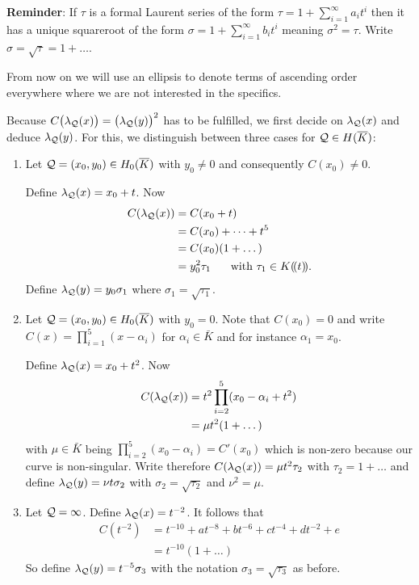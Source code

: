 \documentclass[english,11pt,a4paper]{article}
\begin{document}
\textbf{Reminder}: If $\tau$ is a formal Laurent series of the form $\tau = 1 + \sum_{i = 1}^{\infty} a_i t^i$ then it has a unique squareroot of the form $\sigma = 1+\sum_{i = 1}^{\infty} b_i t^i$ meaning $\sigma^2 = \tau$. Write $\sigma = \sqrt \tau = 1 + \dots$.

From now on we will use an ellipsis to denote terms of ascending order everywhere where we are not interested in the specifics.

\begin{defin}
	Because $C\big(\lambda_{\mathcal{Q}}(x)\big)=\big(\lambda_{\mathcal{Q}}(y)\big)^2$ has to be fulfilled, we first decide on $\lambda_{\mathcal{Q}}(x)$ and deduce $\lambda_{\mathcal{Q}}(y)$. For this, we distinguish between three cases for $\mathcal{Q} \in H(\overline K)$:
	\begin{enumerate}[1.]
		\item Let $\mathcal{Q} =(x_0,y_0) \in H_0(\overline K)$ with $y_0 \neq 0$ and consequently $C(x_0)\neq 0$.

		Define $\lambda_{\mathcal{Q}}(x) = x_0 + t$. Now
		\begin{align*}
		  C(\lpx) &= C(x_0+t)\\
		          &= C(x_0)+ \dots + t^5\\
		          &= C(x_0)(1 + \dots)\\ %
		          &= y_0^2 \tau_1 \text{\hspace{5mm} with } \tau_1 \in K (\! (t)\! ).
		\end{align*}
		Define $\lambda_{\mathcal{Q}}(y) = y_0 \sigma_1$ where $\sigma_1 = \sqrt{\tau_1}$.

		\item Let $\mathcal{Q} =(x_0,y_0) \in H_0(\overline K)$ with $y_0 = 0$.	Note that $C(x_0)=0$ and write $C(x)=\prod_{i=1}^5 (x-\alpha_i)$ for $\alpha_i \in \bar K$ and for instance $\alpha_1 = x_0$.

		Define $\lambda_{\mathcal{Q}}(x) = x_0 + t^2$. Now
		\begin{align*}
		  C(\lambda_{\mathcal{Q}}(x)) &= t^2 \prod_{i=2}^5 (x_0 -\alpha_i + t^2) \\
		          &= \mu t^2 (1 + \dots)
		\end{align*}
		with $\mu \in \bar K$ being $\prod_{i=2}^5 (x_0 - \alpha_i) = C'(x_0)$ which is non-zero because our curve is non-singular. Write therefore $C(\lambda_{\mathcal{Q}}(x)) = \mu t^2 \tau_2$ with $\tau_2 = 1 + \dots$ and define $\lambda_{\mathcal{Q}}(y) = \nu t \sigma_2$ with $\sigma_2 = \sqrt{\tau_2}$ and $\nu^2 = \mu$.%

		\item Let $\mathcal{Q} = \infty$. Define $\lambda_{\mathcal{Q}}(x) = t^{-2}$. It follows that
		\begin{align*}
			C(t^{-2}) &= t^{-10} + at^{-8} + bt^{-6}
											  + ct^{-4}    + dt^{-2} + e\\
											 &= t^{-10} (1 + \dots)
		\end{align*}
		So define $\lambda_{\mathcal{Q}}(y) = t^{-5}\sigma_3$ with the notation $\sigma_3 = \sqrt{\tau_3}$ as before.
	\end{enumerate}
\end{defin}
\end{document}
